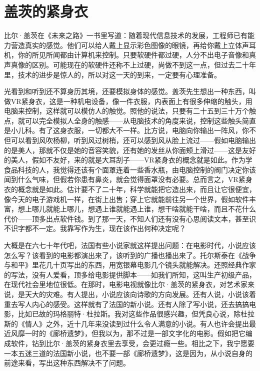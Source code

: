 \chapter{盖茨的紧身衣}

比尔·盖茨在《未来之路》一书里写道：随着现代信息技术的发展，工程师已有能力营造真实的感觉。他们可以给人戴上显示彩色图像的眼镜，再给你戴上立体声耳机，你的所见所闻都由计算机来控制。只要软硬件都过硬，人分不出电子音像和真声真像的区别。可能现在的软硬件还称不上过硬，尚做不到这一点，但过去二十年里，技术的进步是惊人的，所以对这一天的到来，一定要有心理准备。　 

光看到和听到还不算身历其境，还要模拟身体的感觉。盖茨先生想出一种东西，叫做VR紧身衣，这是一种机电设备，像一件衣服，内表面上有很多伸缩的触头，用电脑来控制，这样就可以模仿人的触觉。照他的说法，只要有二十五到三十万个触点，就可以完全模拟人全身的触感——从电脑技术的角度来说，控制这些触头简直是小儿科。有了这身衣服，一切都大不一样。比方说，电脑向你输出一阵风，你不但可以看到风吹杨柳，听到风过树梢，还可以感到风从脸上流过——假如电脑输出的是美人，那就不仅是她的音容笑貌，还有她的发丝从你面颊上滑过——这是友好的美人，假如不友好，来的就是大耳刮子——VR紧身衣的概念就是如此。作为学食品科技的人，我觉得还该有个面罩连着一些香水瓶，由电脑控制的阀门决定你该闻到什么气味，但假若你患有鼻炎，就会觉得面罩没有必要。总而言之，VR紧身衣的概念就是如此。估计要不了二十年，科学就能把它造出来，而且让它很便宜，像今天的电子游戏机一样，在街上出售；穿上它就能前往另一个世界，假如软件丰富，想上哪儿就能上哪儿，想遇上谁就能遇上谁，想干啥就能干啥，而且不花什么代价——顶多出点软件钱。到了那一天，不知人们还有没有心思阅读文本，甚至识不识字都不一定。我靠写作为生，现在该作出何种决定呢？　 

大概是在六七十年代吧，法国有些小说家就这样提出问题：在电影时代，小说应该怎么写？该看到的电影都演出来了，该听到的广播也播出来了。托尔斯泰在《战争与和平》里花几十页写出的东西，用宽银幕电影几个镜头就能解决。还照经典作家的写法，没有人爱看，顶多给电影提供脚本——如我们所知，这叫生产初级产品，在现代社会里地位很低。在那时，电影电视就像比尔·盖茨的紧身衣，对艺术家来说，是天大的灾难。有人提出，小说应该向诗歌的方向发展。还有人说，小说该着重去写人内心的感受。这样就有了法国的新小说。还有人除了写小说，还去搞搞电影，比如已故的玛格丽特·杜拉斯。我对这些作品很感兴趣，但凭良心说，除杜拉斯的《情人》之外，近十几年来没读到过什么令人满意的小说。有人也许会提出最近风靡一时的《廊桥遗梦》，但我以为，那不过是一部文字化的电影。假如把它编成软件，钻到比尔·盖茨的紧身衣里去享受，会更过瘾一些。相比之下，我宁愿要一本五迷三道的法国新小说，也不要一部《廊桥遗梦》，这是因为，从小说自身的前途来看，写出这种东西解决不了问题。　 

